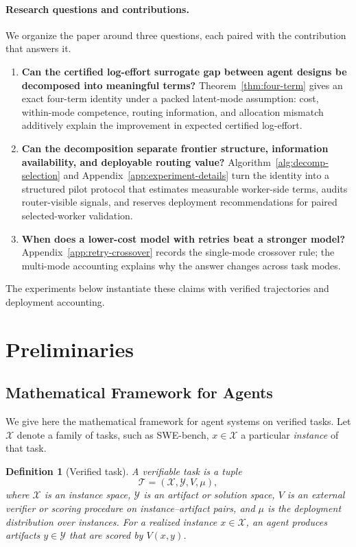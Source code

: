\documentclass{article}
\newtheorem{definition}{Definition}
\begin{document}
\paragraph{Research questions and contributions.}
We organize the paper around three questions, each paired with the contribution that answers it.

\begin{enumerate}[leftmargin=1.4em,itemsep=0.15em]
  \item \textbf{Can the certified log-effort surrogate gap between agent designs be decomposed into meaningful terms?}
  Theorem~\ref{thm:four-term} gives an exact four-term identity under a packed latent-mode assumption: cost, within-mode competence, routing information, and allocation mismatch additively explain the improvement in expected certified log-effort.
  \item \textbf{Can the decomposition separate frontier structure, information availability, and deployable routing value?}
  Algorithm~\ref{alg:decomp-selection} and Appendix~\ref{app:experiment-details} turn the identity into a structured pilot protocol that estimates measurable worker-side terms, audits router-visible signals, and reserves deployment recommendations for paired selected-worker validation.
  \item \textbf{When does a lower-cost model with retries beat a stronger model?}
  Appendix~\ref{app:retry-crossover} records the single-mode crossover rule; the multi-mode accounting explains why the answer changes across task modes.
\end{enumerate}

The experiments below instantiate these claims with verified trajectories and deployment accounting.

\section{Preliminaries}
\label{sec:framework}

\subsection{Mathematical Framework for Agents}
We give here the mathematical framework for agent systems on verified tasks. Let \(\mathcal X\) denote a family of tasks, such as
SWE-bench, \(x\in\mathcal X\) a particular \textit{instance} of that task.

\begin{definition}[Verified task]
\label{def:verified-task}
A verifiable task is a tuple
\[
\mathcal T=(\mathcal X,\mathcal Y,V,\mu),
\]
where $\mathcal X$ is an instance space, $\mathcal Y$ is an artifact or solution space,
$V$ is an external verifier or scoring procedure on instance--artifact pairs, and
$\mu$ is the deployment distribution over instances.
For a realized instance $x\in\mathcal X$, an agent produces artifacts $y\in\mathcal Y$ that are scored by $V(x,y)$.
\end{definition}
\end{document}
